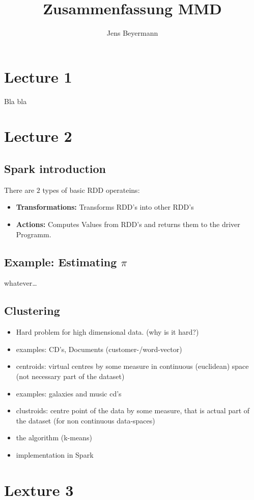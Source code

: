 \documentclass[]{article}
\title{Zusammenfassung MMD}
\author{Jens Beyermann}
\begin{document}
\maketitle

\section{Lecture 1}

Bla bla

\section{Lecture 2}

\subsection{Spark introduction}
There are $2$ types of basic RDD operateins:
\begin{itemize}
\item \textbf{Transformations:} Transforms RDD's into other RDD's
\item \textbf{Actions:} Computes Values from RDD's and returns them to the driver Programm.
\end{itemize}
\subsection{Example: Estimating $\pi$}
whatever\dots
\subsection{Clustering}
\begin{itemize}
\item Hard problem for high dimensional data. (why is it hard?)
\item examples: CD's, Documents (customer-/word-vector)
\item centroids: virtual centres by some measure in continuous (euclidean) space (not necessary part of the dataset)
\item examples: galaxies and music cd's
\item clustroids: centre point of the data by some measure, that is actual part of the dataset (for non continuous data-spaces)
\item the algorithm (k-means)
\item implementation in Spark
\end{itemize}

\section{Lexture 3}
\end{document}
